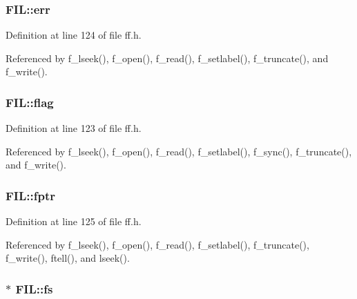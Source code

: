 \subsubsection[{\texorpdfstring{err}{err}}]{ F\+I\+L\+::err}\hypertarget{structFIL_aea440945db26de9c4a88065c0c887fda}{}\label{structFIL_aea440945db26de9c4a88065c0c887fda}


Definition at line 124 of file ff.\+h.



Referenced by f\+\_\+lseek(), f\+\_\+open(), f\+\_\+read(), f\+\_\+setlabel(), f\+\_\+truncate(), and f\+\_\+write().

\subsubsection[{\texorpdfstring{flag}{flag}}]{ F\+I\+L\+::flag}\hypertarget{structFIL_ac409508881f5a16f2998ae675072b376}{}\label{structFIL_ac409508881f5a16f2998ae675072b376}


Definition at line 123 of file ff.\+h.



Referenced by f\+\_\+lseek(), f\+\_\+open(), f\+\_\+read(), f\+\_\+setlabel(), f\+\_\+sync(), f\+\_\+truncate(), and f\+\_\+write().

\subsubsection[{\texorpdfstring{fptr}{fptr}}]{ F\+I\+L\+::fptr}\hypertarget{structFIL_a75d29cf9257c827d117887b9f924c4a9}{}\label{structFIL_a75d29cf9257c827d117887b9f924c4a9}


Definition at line 125 of file ff.\+h.



Referenced by f\+\_\+lseek(), f\+\_\+open(), f\+\_\+read(), f\+\_\+setlabel(), f\+\_\+truncate(), f\+\_\+write(), ftell(), and lseek().

\subsubsection[{\texorpdfstring{fs}{fs}}]{$\ast$ F\+I\+L\+::fs}\hypertarget{structFIL_a42376a6797a06228911c8b836c1e9030}{}\label{structFIL_a42376a6797a06228911c8b836c1e9030}



